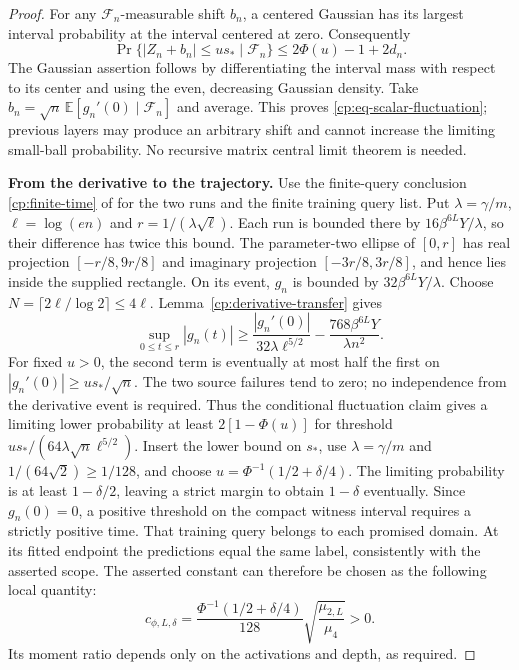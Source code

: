 \begin{proof}
For any $\mathcal F_n$-measurable shift $b_n$, a centered Gaussian has
its largest interval probability at the interval centered at zero.
Consequently
\[
 \Pr\{|Z_n+b_n|\le us_*\mid\mathcal F_n\}
 \le2\Phi(u)-1+2d_n.
\]
The Gaussian assertion follows by differentiating the interval mass
with respect to its center and using the even, decreasing Gaussian
density.  Take
$b_n=\sqrt n\,\mathbb E[g_n'(0)\mid\mathcal F_n]$ and average.
This proves \eqref{cp:eq-scalar-fluctuation}; previous layers may
produce an arbitrary shift and cannot increase the limiting small-ball
probability.  No recursive matrix central limit theorem is needed.

\noindent\textbf{From the derivative to the trajectory.}\quad
Use the finite-query conclusion \eqref{cp:finite-time} of
 for the two runs and the finite training query list.
Put $\lambda=\gamma/m$, $\ell=\log(en)$ and
$r=1/(\lambda\sqrt\ell)$. Each run is bounded there by
$16\beta^{6L}Y/\lambda$, so their difference has twice this bound.
The parameter-two ellipse of $[0,r]$ has real projection
$[-r/8,9r/8]$ and imaginary projection $[-3r/8,3r/8]$, and hence lies
inside the supplied rectangle.  On its event, $g_n$ is bounded by
$32\beta^{6L}Y/\lambda$.  Choose
$N=\lceil2\ell/\log2\rceil\le4\ell$.
Lemma~\ref{cp:derivative-transfer} gives
\[
 \sup_{0\le t\le r}|g_n(t)|
 \ge\frac{|g_n'(0)|}{32\lambda\ell^{5/2}}
       -\frac{768\beta^{6L}Y}{\lambda n^2}.
\]
For fixed $u>0$, the second term is eventually at most half the first
on $|g_n'(0)|\ge us_*/\sqrt n$.  The two source failures tend to zero;
no independence from the derivative event is required.  Thus
the conditional fluctuation claim gives a limiting lower probability
at least $2[1-\Phi(u)]$ for threshold
$us_*/(64\lambda\sqrt n\ell^{5/2})$.
Insert the lower bound on $s_*$, use $\lambda=\gamma/m$ and
$1/(64\sqrt2)\ge1/128$, and choose
$u=\Phi^{-1}(1/2+\delta/4)$.  The limiting probability is at least
$1-\delta/2$, leaving a strict margin to obtain $1-\delta$ eventually.
Since $g_n(0)=0$, a positive threshold on the compact witness interval
requires a strictly positive time.  That training query belongs to
each promised domain.  At its fitted endpoint the predictions equal
the same label, consistently with the asserted scope.
The asserted constant can therefore be chosen as the following local
quantity:
\[
 c_{\phi,L,\delta}=
 \frac{\Phi^{-1}(1/2+\delta/4)}{128}
 \sqrt{\frac{\mu_{2,L}}{\mu_4}}>0.
\]
Its moment ratio depends only on the activations and depth, as required.
\end{proof}

